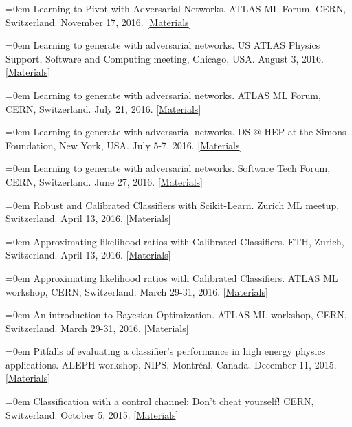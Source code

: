 \documentclass{scrartcl}
\newcommand{\MarginText}[1]{\marginpar{\raggedleft\itshape\small#1}}
\newcommand{\NewPublication}[4]{\noindent\hangindent=0em\hangafter=0 \MarginText{\color{black} #1}{\footnotesize [{\color{Maroon}#2}]} #3 {\footnotesize\color{gray}#4}\vspace{0.5em}}
\begin{document}
\begin{cv}{}
\NewPublication{}{26}{Learning to Pivot with Adversarial Networks.}{%
ATLAS ML Forum, CERN, Switzerland.
November 17, 2016.
[\href{https://github.com/glouppe/talk-learning-to-pivot}{Materials}]}

\NewPublication{}{25}{Learning to generate with adversarial networks.}{%
US ATLAS Physics Support, Software and Computing meeting, Chicago, USA.
August 3, 2016.
[\href{https://indico.cern.ch/event/526308/}{Materials}]}

\NewPublication{}{24}{Learning to generate with adversarial networks.}{%
ATLAS ML Forum, CERN, Switzerland.
July 21, 2016.
[\href{https://indico.cern.ch/event/556591/}{Materials}]}

\NewPublication{}{23}{Learning to generate with adversarial networks.}{%
DS @ HEP at the Simons Foundation, New York, USA.
July 5-7, 2016.
[\href{https://indico.hep.caltech.edu/indico/conferenceTimeTable.py?confId=102}{Materials}]}

\NewPublication{}{22}{Learning to generate with adversarial networks.}{%
Software Tech Forum, CERN, Switzerland.
June 27, 2016.
[\href{https://indico.cern.ch/event/544644/contributions/2210328/attachments/1299201/1938586/slides.pdf}{Materials}]}

\NewPublication{}{21}{Robust and Calibrated Classifiers with Scikit-Learn.}{%
Zurich ML meetup, Switzerland.
April 13, 2016.
[\href{https://github.com/glouppe/tutorials-scikit-learn}{Materials}]}

\NewPublication{}{20}{Approximating likelihood ratios with Calibrated Classifiers.}{%
ETH, Zurich, Switzerland.
April 13, 2016.
[\href{https://github.com/glouppe/talk-approximating-likelihood-ratios-with-classifiers}{Materials}]}

\NewPublication{}{19}{Approximating likelihood ratios with Calibrated Classifiers.}{%
ATLAS ML workshop, CERN, Switzerland.
March 29-31, 2016.
[\href{https://github.com/glouppe/talk-approximating-likelihood-ratios-with-classifiers}{Materials}]}

\NewPublication{}{18}{An introduction to Bayesian Optimization.}{%
ATLAS ML workshop, CERN, Switzerland.
March 29-31, 2016.
[\href{https://github.com/glouppe/talk-bayesian-optimisation}{Materials}]}

\NewPublication{}{17}{Pitfalls of evaluating a classifier’s performance in high energy physics applications.}{%
ALEPH workshop, NIPS, Montr\'eal, Canada.
December 11, 2015.
[\href{https://github.com/glouppe/talk-aleph-workshop2015}{Materials}]}

\NewPublication{}{16}{Classification with a control channel: Don't cheat yourself!}{%
CERN, Switzerland.
October 5, 2015.
[\href{https://github.com/glouppe/talk-classification-control-channel}{Materials}]}


\end{cv}
\end{document}
